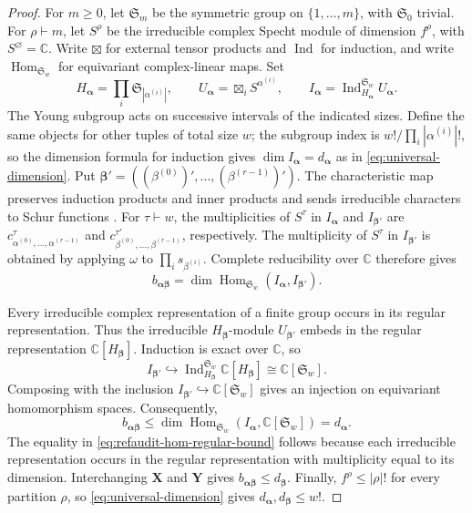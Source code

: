 \documentclass[12pt,reqno,a4paper]{amsart}
\numberwithin{equation}{section}
\numberwithin{figure}{section}
\theoremstyle{plain}
\theoremstyle{definition}
\newcommand{\Sym}{\mathfrak S}
\DeclareMathOperator{\Ind}{Ind}
\begin{document}
\begin{proof}
For $m\geq0$, let $\Sym_m$ be the symmetric group on
$\{1,\ldots,m\}$, with $\Sym_0$ trivial.
For $\rho\vdash m$, let $S^\rho$ be the irreducible complex Specht
module of dimension $f^\rho$, with $S^\varnothing=\mathbb C$.
Write $\boxtimes$ for external tensor products and $\Ind$ for
induction, and write $\operatorname{Hom}_{\Sym_w}$ for equivariant
complex-linear maps. Set
\[
 H_{\boldsymbol\alpha}=\prod_i\Sym_{|\alpha^{(i)}|},
 \qquad
 U_{\boldsymbol\alpha}=\boxtimes_i S^{\alpha^{(i)}},
 \qquad
 I_{\boldsymbol\alpha}
 =\Ind_{H_{\boldsymbol\alpha}}^{\Sym_w}U_{\boldsymbol\alpha}.
\]
The Young subgroup acts on successive intervals of the indicated
sizes. Define the same objects for other tuples of total size $w$;
the subgroup index is $w!/\prod_i|\alpha^{(i)}|!$, so the dimension
formula for induction gives
$\dim I_{\boldsymbol\alpha}=d_{\boldsymbol\alpha}$ as in
\eqref{eq:universal-dimension}.
Put $\boldsymbol\beta'=((\beta^{(0)})',\ldots,(\beta^{(r-1)})')$.
The characteristic map preserves induction products and inner
products and sends irreducible characters to Schur functions
\cite[Chapter~I, (7.3), (7.5)--(7.6), pp.~113--114]{Macdonald}.
For $\tau\vdash w$, the multiplicities of $S^\tau$ in
$I_{\boldsymbol\alpha}$ and $I_{\boldsymbol\beta'}$ are
$c^\tau_{\alpha^{(0)},\ldots,\alpha^{(r-1)}}$ and
$c^{\tau'}_{\beta^{(0)},\ldots,\beta^{(r-1)}}$, respectively.
The multiplicity of $S^\tau$ in $I_{\boldsymbol\beta'}$ is obtained
by applying $\omega$ to $\prod_i s_{\beta^{(i)}}$.
Complete reducibility over $\mathbb C$ therefore gives
\[
 b_{\boldsymbol\alpha\boldsymbol\beta}
 =\dim\operatorname{Hom}_{\Sym_w}
      (I_{\boldsymbol\alpha},I_{\boldsymbol\beta'}).
\]

Every irreducible complex representation of a finite group occurs
in its regular representation.  Thus the irreducible
$H_{\boldsymbol\beta}$-module
$U_{\boldsymbol\beta'}$ embeds in the regular representation
$\mathbb C[H_{\boldsymbol\beta}]$.
Induction is exact over $\mathbb C$, so
\[
 I_{\boldsymbol\beta'}\hookrightarrow
 \Ind_{H_{\boldsymbol\beta}}^{\Sym_w}\mathbb C[H_{\boldsymbol\beta}]
 \cong\mathbb C[\Sym_w].
\]
Composing with the inclusion
$I_{\boldsymbol\beta'}\hookrightarrow\mathbb C[\Sym_w]$ gives an
injection on equivariant homomorphism spaces.  Consequently,
\begin{equation}\label{eq:refaudit-hom-regular-bound}
 b_{\boldsymbol\alpha\boldsymbol\beta}
 \leq\dim\operatorname{Hom}_{\Sym_w}
       (I_{\boldsymbol\alpha},\mathbb C[\Sym_w])
 =d_{\boldsymbol\alpha}.
\end{equation}
The equality in \eqref{eq:refaudit-hom-regular-bound} follows because
each irreducible representation occurs in the regular representation
with multiplicity equal to its dimension. Interchanging $\mathbf X$ and $\mathbf Y$ gives
$b_{\boldsymbol\alpha\boldsymbol\beta}\leq d_{\boldsymbol\beta}$.
Finally, $f^\rho\leq|\rho|!$ for every partition $\rho$, so
\eqref{eq:universal-dimension} gives
$d_{\boldsymbol\alpha},d_{\boldsymbol\beta}\leq w!$.
\end{proof}
\end{document}
